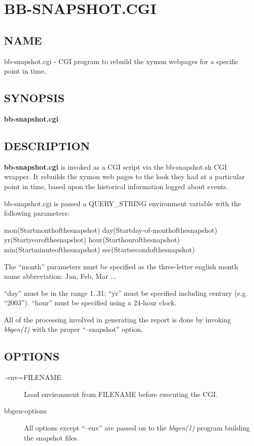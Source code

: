  
%
\newpage
\section{BB-SNAPSHOT.CGI}
\subsection{NAME}
 bb-snapshot.cgi - CGI program to rebuild the xymon webpages for a
 specific point in time. 
\subsection{SYNOPSIS}

\textbf{bb-snapshot.cgi}


 
\subsection{DESCRIPTION}
\textbf{bb-snapshot.cgi} is invoked as a CGI script via the
bb-snapshot.sh CGI wrapper. It rebuilds the xymon web pages to the
look they had at a particular point in time, based upon the historical
information logged about events. 


 bb-snapshot.cgi is passed a QUERY\_STRING environment variable with the following parameters: 


  
mon(Startmonthofthesnapshot)  
day(Startday-of-monthofthesnapshot)  
yr(Startyearofthesnapshot)  
hour(Starthourofthesnapshot)  
min(Startminuteofthesnapshot)  
sec(Startsecondofthesnapshot) 


  The ``month'' parameters must be specified as the three-letter
  english month name abbreviation: Jan, Feb, Mar ... 



  ``day'' must be in the range 1..31; ``yr'' must be specified
  including century (e.g. ``2003''). ``hour'' must be specified using
  a 24-hour clock. 



  All of the processing involved in generating the report is done by
  invoking \emph{bbgen(1)} with the proper ``--snapshot'' option. 


 
\subsection{OPTIONS}
\begin{description}
\item[--env=FILENAME] Load environment from FILENAME before executing the CGI. 

 

\item[bbgen-options] All options except ``--env'' are passed on to the \emph{bbgen(1)}
 program building the snapshot files. 

 


\end{description}


